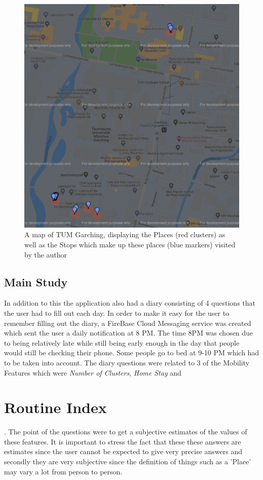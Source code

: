 \begin{figure}
    \centering
    \includegraphics{images/map/map-tum.png}
    \caption{A map of TUM Garching, displaying the Places (red clusters) as well as the Stops which make up these places (blue markers) visited by the author}
    \label{fig:tum-map}
\end{figure}

\subsection{Main Study}
 In addition to this the application also had a diary consisting of 4 questions that the user had to fill out each day. In order to make it easy for the user to remember filling out the diary, a FireBase Cloud Messaging service was created which sent the user a daily notification at 8 PM. The time 8PM was chosen due to being relatively late while still being early enough in the day that people would still be checking their phone. Some people go to bed at 9-10 PM which had to be taken into account. The diary questions were related to 3 of the Mobility Features which were \textit{Number of Clusters}, \textit{Home Stay} and \section{Routine Index}. The point of the questions were to get a subjective estimates of the values of these features. It is important to stress the fact that these these answers are estimates since the user cannot be expected to give very precise answers and secondly they are very subjective since the definition of things such as a 'Place' may vary a lot from person to person.

